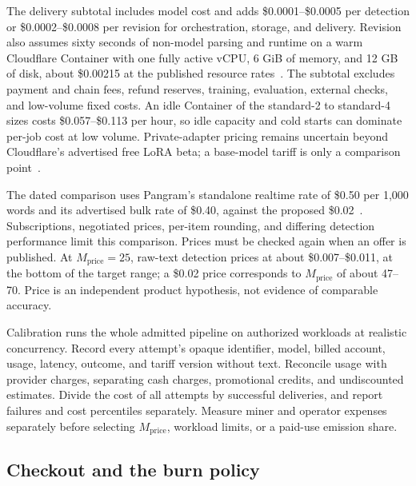 The delivery subtotal includes model cost and adds \$0.0001--\$0.0005 per
detection or \$0.0002--\$0.0008 per revision for orchestration, storage, and
delivery. Revision also assumes sixty seconds of non-model parsing and runtime
on a warm Cloudflare Container with one fully active vCPU, 6 GiB of memory, and
12 GB of disk, about \$0.00215 at the published resource
rates~\cite{cfcontainerspricing}. The subtotal excludes payment and chain fees,
refund reserves, training, evaluation, external checks, and low-volume fixed
costs. An idle Container of the standard-2 to standard-4 sizes costs
\$0.057--\$0.113 per hour, so idle capacity and cold starts can dominate per-job cost at low volume. Private-adapter
pricing remains uncertain beyond Cloudflare's advertised free LoRA beta; a
base-model tariff is only a comparison point~\cite{cfloras}.

The dated comparison uses Pangram's standalone realtime rate of \$0.50 per
1,000 words and its advertised bulk rate of \$0.40, against the proposed
\$0.02~\cite{pangrampricing,pangrambulk}. Subscriptions, negotiated prices,
per-item rounding, and differing detection performance limit this comparison.
Prices must be checked again when an offer is published. At
\(M_{\mathrm{price}}=25\), raw-text detection prices at about \$0.007--\$0.011,
at the bottom of the target range; a \$0.02 price corresponds to
\(M_{\mathrm{price}}\) of about 47--70. Price is an independent product
hypothesis, not evidence of comparable accuracy.

Calibration runs the whole admitted pipeline on authorized workloads at
realistic concurrency. Record every attempt's opaque identifier, model,
billed account, usage, latency, outcome, and tariff version without text.
Reconcile usage with provider charges, separating cash charges, promotional
credits, and undiscounted estimates. Divide the cost of all attempts by
successful deliveries, and report failures and cost percentiles separately.
Measure miner and operator expenses separately before selecting \(M_{\mathrm{price}}\), workload
limits, or a paid-use emission share.

\subsection{Checkout and the burn policy}

